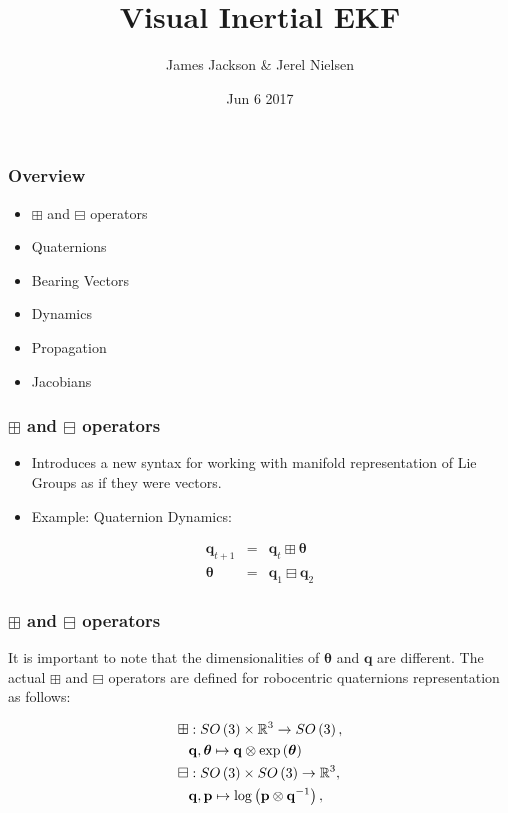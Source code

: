 \documentclass{beamer}
\title{Visual Inertial EKF}
\author{James Jackson \& Jerel Nielsen}
\institute{Brigham Young University}
\date{Jun 6 2017}
\begin{document}
 
\frame{\titlepage}

\begin{frame}
\frametitle{Overview}
\begin{itemize}
	\item $\boxplus$ and $\boxminus$ operators
	\item Quaternions
	\item Bearing Vectors
	\item Dynamics
	\item Propagation
	\item Jacobians
\end{itemize}
\end{frame}
 
\begin{frame}
\frametitle{$\boxplus$ and $\boxminus$ operators}
\begin{itemize}
\item \cite{key-1}Introduces a new syntax for working with manifold representation
of Lie Groups as if they were vectors.
\item Example: Quaternion Dynamics:
\end{itemize}
\begin{eqnarray}
\boldsymbol{q}_{t+1} & = & \boldsymbol{q}_{t}\boxplus\boldsymbol{\theta}\\
\boldsymbol{\theta} & = & \boldsymbol{q}_{1}\boxminus\boldsymbol{q}_{2}
\end{eqnarray}
\end{frame}


 
\begin{frame}
\frametitle{$\boxplus$ and $\boxminus$ operators}
It is important to note that the dimensionalities of $\boldsymbol{\theta}$
and $\boldsymbol{q}$ are different. The actual $\boxplus$ and $\boxminus$
operators are defined for robocentric quaternions representation as
follows:

\begin{eqnarray}
\boxplus & :SO\left(3\right)\times\mathbb{R}^{3}\rightarrow SO\left(3\right),\\
 & {\bf q},\boldsymbol{\theta}\mapsto{\bf q}\otimes\exp\left(\boldsymbol{\theta}\right)\\
\boxminus & :SO\left(3\right)\times SO\left(3\right)\rightarrow\mathbb{R}^{3},\\
 & {\bf q},{\bf p}\mapsto\log\left({\bf p}\otimes{\bf q}^{-1}\right),
\end{eqnarray}
\end{frame}
\end{document}
